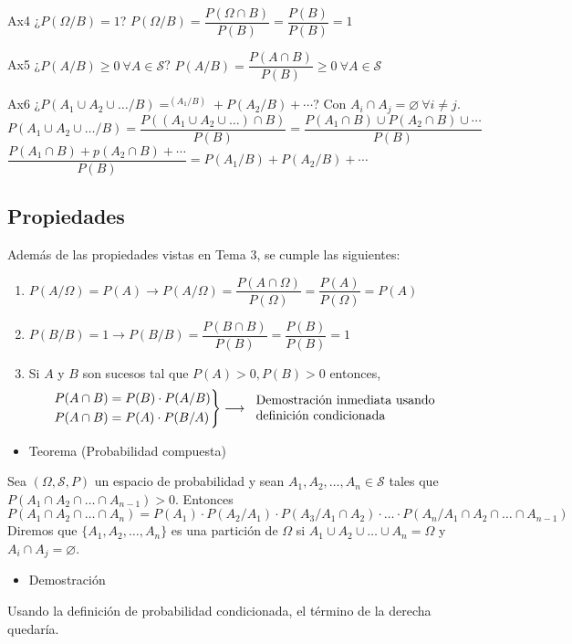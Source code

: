 Ax4 ¿$P(\Omega/B)=1$? $P(\Omega/B)=\dfrac{P(\Omega\cap B)}{P(B)}=\dfrac{P(B)}{P(B)}=1$

Ax5 ¿$P(A/B)\ge0\:\forall A\in\mathcal{S}$? $P(A/B)=\dfrac{P(A\cap B)}{P(B)}\ge0\:\forall A\in\mathcal{S}$

Ax6 ¿$P(A_1\cup A_2\cup \dots/B)=^(A_1/B)+P(A_2/B)+\cdots$? Con $A_i\cap A_j=\varnothing\:\forall i\neq j$.\\
$P(A_1\cup A_2\cup \dots/B)=\dfrac{P\left((A_1\cup A_2\cup \dots)\cap B\right)}{P(B)}=\dfrac{P(A_1\cap B)\cup P(A_2\cap B)\cup \cdots}{P(B)}$\\
$\dfrac{P(A_1\cap B)+p(A_2\cap B)+\cdots}{P(B)}=P(A_1/B)+P(A_2/B)+\cdots$
\subsection{Propiedades}
Además de las propiedades vistas en Tema 3, se cumple las siguientes:
\begin{enumerate}[label=\color{lightblue}\arabic*)]
	\item $P(A/\Omega)=P(A)\longrightarrow P(A/\Omega)=\dfrac{P(A\cap \Omega)}{P(\Omega)}=\dfrac{P(A)}{P(\Omega)}=P(A)$
	\item $P(B/B)=1\longrightarrow P(B/B)=\dfrac{P(B\cap B)}{P(B)}=\dfrac{P(B)}{P(B)}=1$
	\item {} Si $A$ y $B$ son sucesos tal que $P(A)>0, P(B)>0$ entonces, \[ \begin{rcases}
		P(A\cap B)=P(B)\cdot P(A/B)\\
		P(A\cap B)=P(A)\cdot P(B/A)
	\end{rcases}\longrightarrow\begin{tabular}{l}
	Demostración inmediata usando\\
	definición condicionada
	\end{tabular} \]
\end{enumerate}
\begin{itemize}[label=\color{red}\textbullet, leftmargin=*]
	\item \color{lightblue}Teorema (Probabilidad compuesta)
\end{itemize}
Sea $(\Omega,\mathcal{S},P)$ un espacio de probabilidad y sean $A_1,A_2,\dots,A_n\in\mathcal{S}$ tales que $P(A_1\cap A_2\cap \dots\cap A_{n-1})>0$. Entonces\[ P(A_1\cap A_2\cap \dots\cap A_n)=P(A_1)\cdot P(A_2/A_1)\cdot P(A_3/A_1\cap A_2)\cdot \dots \cdot P(A_n/A_1\cap A_2\cap \dots\cap A_{n-1}) \]Diremos que $\{A_1,A_2,\dots,A_n\}$ es una partición de $\Omega$ si $A_1\cup A_2\cup\dots\cup A_n=\Omega$ y $A_i\cap A_j=\varnothing$.
\begin{itemize}[label=\color{red}\textbullet, leftmargin=*]
	\item \color{lightblue}Demostración
\end{itemize}
Usando la definición de probabilidad condicionada, el término de la derecha quedaría.

